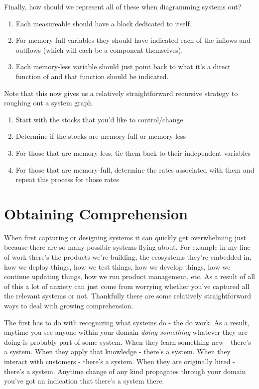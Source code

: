 \documentclass[11pt,a5paper]{book}
\begin{document}
Finally, how should we represent all of these when diagramming systems out? 

\begin{enumerate}
\item Each measureable should have a block dedicated to itself. 
\item For memory-full variables they should have indicated each of the inflows and outflows (which will each be a component themselves).
\item Each memory-less variable should just point back to what it's a direct function of and that function should be indicated.
\end{enumerate}

Note that this now gives us a relatively straightforward recursive strategy to roughing out a system graph. 

\begin{enumerate}
\item Start with the stocks that you'd like to control/change
\item Determine if the stocks are memory-full or memory-less
\item For those that are memory-less, tie them back to their independent variables
\item For those that are memory-full, determine the rates associated with them and repeat this process for those rates
\end{enumerate}

\section{Obtaining Comprehension}
When first capturing or designing systems it can quickly get overwhelming just because there are so many possible systems flying about. For example in my line of work there's the products we're building, the ecosystems they're embedded in, how we deploy things, how we test things, how we develop things, how we continue updating things, how we run product management, etc. As a result of all of this a lot of anxiety can just come from worrying whether you've captured all the relevant systems or not. Thankfully there are some relatively straightforward ways to deal with growing comprehension. 
\newline

The first has to do with recognizing what systems do - the do work. As a result, anytime you see anyone within your domain \textit{doing something} whatever they are doing is probably part of some system. When they learn something new - there's a system. When they apply that knowledge - there's a system. When they interact with customers - there's a system. When they are originally hired - there's a system. Anytime change of any kind propagates through your domain you've got an indication that there's a system there.
\newline
\end{document}
